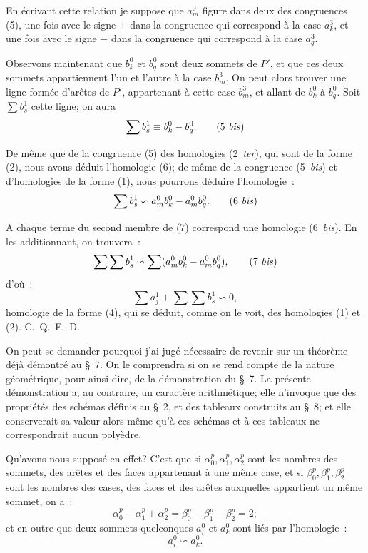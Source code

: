\documentclass{article}
\begin{document}
En écrivant cette relation je suppose que $a^{0}_{m}$ figure dans deux des congruences (5), une fois avec le signe $+$ dans la congruence qui correspond à la case $a^{3}_{k}$, et une fois avec le signe $-$ dans la congruence qui correspond à la case $a^{3}_{q}$.

Observons maintenant que $b^{0}_{k}$ et $b^{0}_{q}$ sont deux sommets de $P'$, et que ces deux sommets appartiennent l'un et l'autre à la case $b^{3}_{m}$. On peut alors trouver une ligne formée d'arêtes de $P'$, appartenant à cette case $b^{3}_{m}$, et allant de $b^{0}_{k}$ à $b^{0}_{q}$. Soit $\displaystyle\sum b^{1}_{s}$ cette ligne; on aura
\[ \sum b^{1}_{s} \equiv b^{0}_{k} - b^{0}_{q}. \tag{5 \textit{bis}} \]


De même que de la congruence (5) des homologies (2~\emph{ter}), qui sont de la forme (2), nous avons déduit l'homologie (6); de même de la congruence (5~\emph{bis}) et d'homologies de la forme (1), nous pourrons déduire l'homologie~:
\[ \sum b^{1}_{s} \backsim a^{0}_{m} b^{0}_{k} - a^{0}_{m} b^{0}_{q}. \tag{6 \textit{bis}} \]

A chaque terme du second membre de (7) correspond une homologie (6~\emph{bis}). En les additionnant, on trouvera~:
\[ \sum \sum b^{1}_{s} \backsim \sum (a^{0}_{m} b^{0}_{k} - a^{0}_{m} b^{0}_{q}), \tag{7 \textit{bis}} \]
d'où~:
\[ \sum a^{1}_{j} + \sum \sum b^{1}_{s} \backsim 0, \tag{8} \]
homologie de la forme (4), qui se déduit, comme on le voit, des homologies (1) et (2). C.~Q.~F.~D.

On peut se demander pourquoi j'ai jugé nécessaire de revenir sur un théorème déjà démontré au \S~7. On le comprendra si on se rend compte de la nature géométrique, pour ainsi dire, de la démonstration du \S~7. La présente démonstration a, au contraire, un caractère arithmétique; elle n'invoque que des propriétés des schémas définis au \S~2, et des tableaux construits au \S~8; et elle conserverait sa valeur alors même qu'à ces schémas et à ces tableaux ne correspondrait aucun polyèdre.

Qu'avons-nous supposé en effet? C'est que si $\alpha^{p}_{0}, \alpha^{p}_{1}, \alpha^{p}_{2}$ sont les nombres des sommets, des arêtes et des faces appartenant à une même case, et si $\beta^{p}_{0}, \beta^{p}_{1}, \beta^{p}_{2}$ sont les nombres des cases, des faces et des arêtes auxquelles appartient un même sommet, on a~:
\[ \alpha^{p}_{0} - \alpha^{p}_{1} + \alpha^{p}_{2} = \beta^{p}_{0} - \beta^{p}_{1} - \beta^{p}_{2} = 2; \]
et en outre que deux sommets quelconques $a^{0}_{i}$ et $a^{0}_{k}$ sont liés par l'homologie~:
\[ a^{0}_{i} \backsim a^{0}_{k}. \tag{9} \]
\end{document}
